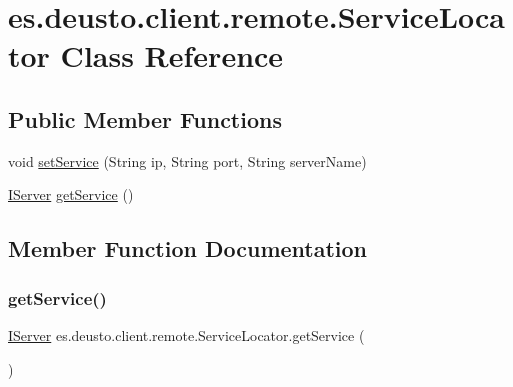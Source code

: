 \hypertarget{classes_1_1deusto_1_1client_1_1remote_1_1_service_locator}{}\section{es.\+deusto.\+client.\+remote.\+Service\+Locator Class Reference}
\label{classes_1_1deusto_1_1client_1_1remote_1_1_service_locator}
\subsection*{Public Member Functions}
\begin{DoxyCompactItemize}
\item 
void \mbox{\hyperlink{classes_1_1deusto_1_1client_1_1remote_1_1_service_locator_a9f497b5c18c305c4426ae69221136293}{set\+Service}} (String ip, String port, String server\+Name)
\item 
\mbox{\hyperlink{interfacees_1_1deusto_1_1server_1_1remote_1_1_i_server}{I\+Server}} \mbox{\hyperlink{classes_1_1deusto_1_1client_1_1remote_1_1_service_locator_a84dab7c3258c5fe2624b1716033347a1}{get\+Service}} ()
\end{DoxyCompactItemize}


\subsection{Member Function Documentation}
\mbox{\label{classes_1_1deusto_1_1client_1_1remote_1_1_service_locator_a84dab7c3258c5fe2624b1716033347a1}} 
\subsubsection{\texorpdfstring{getService()}{getService()}}
{\footnotesize\ttfamily \mbox{\hyperlink{interfacees_1_1deusto_1_1server_1_1remote_1_1_i_server}{I\+Server}} es.\+deusto.\+client.\+remote.\+Service\+Locator.\+get\+Service (\begin{DoxyParamCaption}{ }\end{DoxyParamCaption})}

\mbox{\label{classes_1_1deusto_1_1client_1_1remote_1_1_service_locator_a9f497b5c18c305c4426ae69221136293}} 
